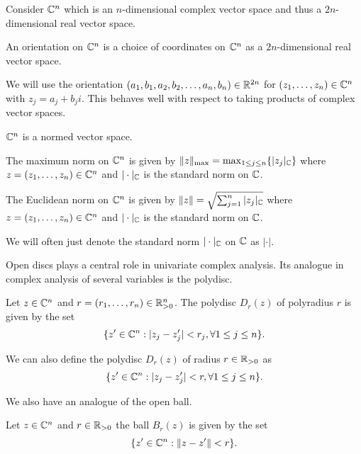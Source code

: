 Consider $\mathbb{C}^{n}$ which is an $n$-dimensional complex vector space and thus a $2n$-dimensional real vector space. 
\begin{definition}[Orientation]\label{def: orientation}
    An orientation on $\mathbb{C}^{n}$ is a choice of coordinates on $\mathbb{C}^{n}$ as a $2n$-dimensional real vector space. 
\end{definition}
\begin{remark}\label{rmk: choice of orientations}
    We will use the orientation $(a_{1},b_{1},a_{2},b_{2},\dots,a_{n},b_{n})\in\mathbb{R}^{2n}$ for $(z_{1},\dots,z_{n})\in\mathbb{C}^{n}$ with $z_{j}=a_{j}+b_{j}i$. This behaves well with respect to taking products of complex vector spaces. 
\end{remark}
$\mathbb{C}^{n}$ is a normed vector space. 
\begin{definition}\label{def: maximum norm}
    The maximum norm on $\mathbb{C}^{n}$ is given by $\Vert z\Vert_{\max}=\max_{1\leq j\leq n}\{|z_{j}|_{\mathbb{C}}\}$ where $z=(z_{1},\dots,z_{n})\in\mathbb{C}^{n}$ and $|\cdot|_{\mathbb{C}}$ is the standard norm on $\mathbb{C}$. 
\end{definition}
\begin{definition}\label{def: Euclidean norm}
    The Euclidean norm on $\mathbb{C}^{n}$ is given by $\Vert z\Vert=\sqrt{\sum_{j=1}^{n}|z_{j}|_{\mathbb{C}}}$ where $z=(z_{1},\dots,z_{n})\in\mathbb{C}^{n}$ and $|\cdot|_{\mathbb{C}}$ is the standard norm on $\mathbb{C}$. 
\end{definition}
\begin{remark}
    We will often just denote the standard norm $|\cdot|_{\mathbb{C}}$ on $\mathbb{C}$ as $|\cdot|$. 
\end{remark}
Open discs plays a central role in univariate complex analysis. Its analogue in complex analysis of several variables is the polydisc. 
\begin{definition}[Polydisc]\label{def: polydisc}
    Let $z\in\mathbb{C}^{n}$ and $r=(r_{1},\dots,r_{n})\in\mathbb{R}_{>0}^{n}$. The polydisc $D_{r}(z)$ of polyradius $r$ is given by the set 
    $$\{z'\in\mathbb{C}^{n}:|z_{j}-z_{j}'|<r_{j}, \forall 1\leq j\leq n\}.$$
\end{definition}
\begin{remark}
    We can also define the polydisc $D_{r}(z)$ of radius $r\in\mathbb{R}_{>0}$ as 
    $$\{z'\in\mathbb{C}^{n}:|z_{j}-z_{j}'|<r, \forall 1\leq j\leq n\}.$$
\end{remark}
We also have an analogue of the open ball. 
\begin{definition}\label{def: multivariate open ball}
    Let $z\in\mathbb{C}^{n}$ and $r\in\mathbb{R}_{>0}$ the ball $B_{r}(z)$ is given by the set 
    $$\{z'\in\mathbb{C}^{n}:\Vert z-z'\Vert < r\}.$$
\end{definition}
